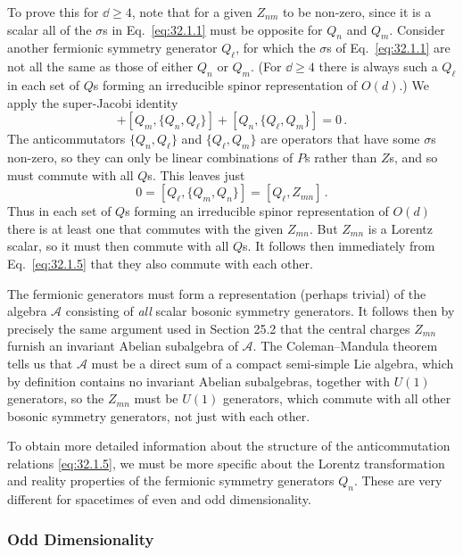 To prove this for \(\dd\geq4\), note that for a given \(Z_{nm}\) to be
non-zero, since it is a scalar all of the \(\sigma\)s in
Eq.~\eqref{eq:32.1.1} must be opposite for \(Q_n\) and \(Q_m\). Consider
another fermionic symmetry generator \(Q_\ell\), for which the \(\sigma\)s
of Eq.~\eqref{eq:32.1.1} are not all the same as those of either \(Q_n\)
or \(Q_m\). (For \(\dd\geq4\) there is always such a \(Q_\ell\) in each set
of \(Q\)s forming an irreducible spinor representation of \(O(d)\).) We
apply the super-Jacobi identity
\begin{equation}
  [Q_\ell,\{Q_m,Q_n\}]
  +[Q_m,\{Q_n,Q_\ell\}]
  +[Q_n,\{Q_\ell,Q_m\}]=0\,.
  \tag{32.1.6}\label{eq:32.1.6}
\end{equation}
The anticommutators \(\{Q_n,Q_\ell\}\) and \(\{Q_\ell,Q_m\}\) are
operators that have some \(\sigma\)s non-zero, so they can only be linear
combinations of \(P\)s rather than \(Z\)s, and so must commute with all
\(Q\)s. This leaves just
\begin{equation}
  0=[Q_\ell,\{Q_m,Q_n\}]=[Q_\ell,Z_{mn}]\,.
  \tag{32.1.7}\label{eq:32.1.7}
\end{equation}
Thus in each set of \(Q\)s forming an irreducible spinor representation of
\(O(d)\) there is at least one that commutes with the given \(Z_{mn}\).
But \(Z_{mn}\) is a Lorentz scalar, so it must then commute with all \(Q\)s.
It follows then immediately from Eq.~\eqref{eq:32.1.5} that they also
commute with each other.

The fermionic generators must form a representation (perhaps trivial) of
the algebra \(\mathcal A\) consisting of \textit{all} scalar bosonic
symmetry generators. It follows then by precisely the same argument used in
Section 25.2 that the central charges \(Z_{mn}\) furnish an invariant
Abelian subalgebra of \(\mathcal A\). The Coleman--Mandula theorem tells us
that \(\mathcal A\) must be a direct sum of a compact semi-simple Lie
algebra, which by definition contains no invariant Abelian subalgebras,
together with \(U(1)\) generators, so the \(Z_{mn}\) must be \(U(1)\)
generators, which commute with all other bosonic symmetry generators, not
just with each other.

To obtain more detailed information about the structure of the
anticommutation relations \eqref{eq:32.1.5}, we must be more specific about
the Lorentz transformation and reality properties of the fermionic symmetry
generators \(Q_n\). These are very different for spacetimes of even and odd
dimensionality.

\subsubsection*{Odd Dimensionality}

